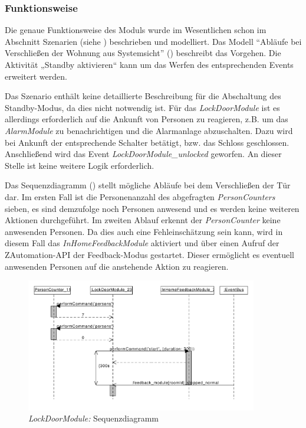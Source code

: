 \subsubsection{Funktionsweise}
Die genaue Funktionsweise des Moduls wurde im Wesentlichen schon im Abschnitt Szenarien (siehe ) beschrieben und modelliert. Das Modell "`Abläufe bei Verschließen der Wohnung aus Systemsicht"' () beschreibt das Vorgehen. Die Aktivität „Standby aktivieren“ kann um das Werfen des entsprechenden Events erweitert werden.

Das Szenario enthält keine detaillierte Beschreibung für die Abschaltung des Standby-Modus, da dies nicht notwendig ist. Für das \emph{LockDoorModule} ist es allerdings erforderlich auf die Ankunft von Personen zu reagieren, z.B. um das \emph{AlarmModule} zu benachrichtigen und die Alarmanlage abzuschalten. %
Dazu wird bei Ankunft der entsprechende Schalter betätigt, bzw. das Schloss geschlossen. Anschließend wird das Event \emph{LockDoorModule\_unlocked} geworfen. An dieser Stelle ist keine weitere Logik erforderlich.

Das Sequenzdiagramm () stellt mögliche Abläufe bei dem Verschließen der Tür dar. Im ersten Fall ist die Personenanzahl des abgefragten \emph{PersonCounters} sieben, es sind demzufolge noch Personen anwesend und es werden keine weiteren Aktionen durchgeführt. Im zweiten Ablauf erkennt der \emph{PersonCounter} keine anwesenden Personen. Da dies auch eine Fehleinschätzung sein kann, wird in diesem Fall das \emph{InHomeFeedbackModule} aktiviert und über einen Aufruf der ZAutomation-API der Feedback-Modus gestartet. Dieser ermöglicht es eventuell anwesenden Personen auf die anstehende Aktion zu reagieren.

\begin{figure}[h!]
	\centering
	\includegraphics[width=0.9\textwidth]{img/Modulkonzeption/LockDoorSequence.pdf}
	\caption{\emph{LockDoorModule:} Sequenzdiagramm}
	\label{fig:modulkonzeptionLockDoorSequence}
\end{figure}

